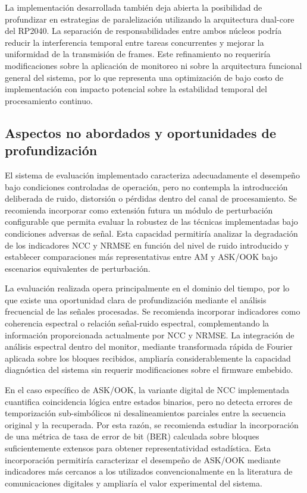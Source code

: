 La implementación desarrollada también deja abierta la posibilidad de profundizar en estrategias de paralelización utilizando la arquitectura dual-core del RP2040. La separación de responsabilidades entre ambos núcleos podría reducir la interferencia temporal entre tareas concurrentes y mejorar la uniformidad de la transmisión de frames. Este refinamiento no requeriría modificaciones sobre la aplicación de monitoreo ni sobre la arquitectura funcional general del sistema, por lo que representa una optimización de bajo costo de implementación con impacto potencial sobre la estabilidad temporal del procesamiento continuo.

\subsection{Aspectos no abordados y oportunidades de profundización}

El sistema de evaluación implementado caracteriza adecuadamente el desempeño bajo condiciones controladas de operación, pero no contempla la introducción deliberada de ruido, distorsión o pérdidas dentro del canal de procesamiento. Se recomienda incorporar como extensión futura un módulo de perturbación configurable que permita evaluar la robustez de las técnicas implementadas bajo condiciones adversas de señal. Esta capacidad permitiría analizar la degradación de los indicadores NCC y NRMSE en función del nivel de ruido introducido y establecer comparaciones más representativas entre AM y ASK/OOK bajo escenarios equivalentes de perturbación.

La evaluación realizada opera principalmente en el dominio del tiempo, por lo que existe una oportunidad clara de profundización mediante el análisis frecuencial de las señales procesadas. Se recomienda incorporar indicadores como coherencia espectral o relación señal-ruido espectral, complementando la información proporcionada actualmente por NCC y NRMSE. La integración de análisis espectral dentro del monitor, mediante transformada rápida de Fourier aplicada sobre los bloques recibidos, ampliaría considerablemente la capacidad diagnóstica del sistema sin requerir modificaciones sobre el firmware embebido.

En el caso específico de ASK/OOK, la variante digital de NCC implementada cuantifica coincidencia lógica entre estados binarios, pero no detecta errores de temporización sub-simbólicos ni desalineamientos parciales entre la secuencia original y la recuperada. Por esta razón, se recomienda estudiar la incorporación de una métrica de tasa de error de bit (BER) calculada sobre bloques suficientemente extensos para obtener representatividad estadística. Esta incorporación permitiría caracterizar el desempeño de ASK/OOK mediante indicadores más cercanos a los utilizados convencionalmente en la literatura de comunicaciones digitales y ampliaría el valor experimental del sistema.

